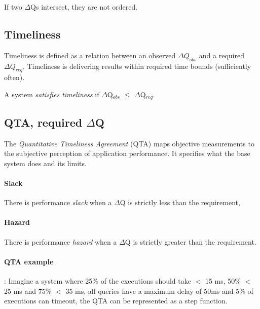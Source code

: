         If two $\Delta$Qs intersect, they are not ordered. \cite{dq-tut}

    \subsection{Timeliness}
        Timeliness is defined as a relation between an observed $\Delta Q_{obs}$ and a required $\Delta Q_{req}$. Timeliness is delivering results within required time bounds (sufficiently often). 

        A system \textit{satisfies timeliness} if $\Delta$Q$_{obs}$ $\le$ $\Delta$Q$_{req}$. \cite{art}
     
    \subsection{QTA, required $\Delta$Q}
         The \textit{Quantitative Timeliness Agreement} (QTA) maps objective measurements to the subjective perception of application performance. It specifies what the base system does and its limits. \cite{dq-br}
    
    \paragraph{Slack} There is performance \textit{slack} when a $\Delta$Q is strictly less than the requirement,

        \paragraph{Hazard} There is performance \textit{hazard} when a $\Delta$Q is strictly greater than the requirement. \cite{myo}
    
    \paragraph{QTA example}: Imagine a system where 25\% of the executions should take $<$ 15 ms, 50\% $<$ 25 ms and 75\% $<$ 35 ms, all queries have a maximum delay of 50ms and 5\% of executions can timeout, the QTA can be represented as a step function.
    
